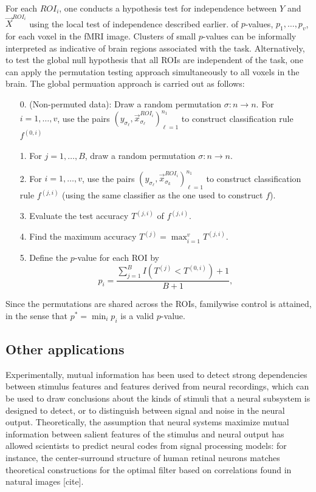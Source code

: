 For each $ROI_i$, one conducts a hypothesis test for independence
between $Y$ and $\vec{X}^{ROI_i}$ using the local test of independence
described earlier.  %
of $p$-values, $p_1,\hdots, p_v$, for each voxel in the fMRI image.
Clusters of small $p$-values can be informally interpreted as
indicative of brain regions associated with the task.  Alternatively,
to test the global null hypothesis that all ROIs are independent of
the task, one can apply the permutation testing approach
simultaneously to all voxels in the brain.  The global permuation
approach is carried out as follows:
\begin{itemize}
\item[0.] (Non-permuted data): Draw a random permutation $\sigma: n \to n$. For $i = 1,\hdots, v$, use the pairs
  $(y_{\sigma_\ell},\vec{x}^{ROI_i}_{\sigma_\ell})_{\ell=1}^{n_1}$ to construct
  classification rule $f^{(0, i)}$
\item[1.] For $j = 1,\hdots, B$, draw a random permutation $\sigma: n \to n$.
\item[2.] For $i = 1,\hdots, v$, use the pairs
  $(y_{\sigma_\ell},\vec{x}^{ROI_i}_{\sigma_k})_{\ell=1}^{n_1}$ to construct
  classification rule $f^{(j, i)}$ (using the same classifier as the one
  used to construct $f$).
\item[3.] Evaluate the test accuracy $T^{(j,i)}$ of $f^{(j, i)}$.
\item[4.] Find the maximum accuracy $T^{(j)} = \max_{i=1}^v T^{(j,i)}$.
\item[5.] Define the $p$-value for each ROI by
\[
p_i =  \frac{\sum_{j=1}^B I(T^{(j)} < T^{(0, i)}) + 1}{B + 1},
\]
\end{itemize}
Since the permutations are shared across the ROIs, familywise control
is attained, in the sense that $p^* = \min_i p_i$ is a valid
$p$-value.

\subsection{Other applications}

Experimentally, mutual information has been used to detect strong
dependencies between stimulus features and features derived from
neural recordings, which can be used to draw conclusions about the
kinds of stimuli that a neural subsystem is designed to detect, or to
distinguish between signal and noise in the neural output.
Theoretically, the assumption that neural systems maximize mutual
information between salient features of the stimulus and neural output
has allowed scientists to predict neural codes from signal processing
models: for instance, the center-surround structure of human retinal
neurons matches theoretical constructions for the optimal filter based
on correlations found in natural images [cite].


